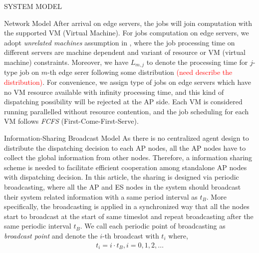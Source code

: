 \documentclass[10pt, conference, letterpaper]{IEEEtran}
\newcommand{\jSpace}{\mathcal{J}}
\begin{document}
\begin{section}{SYSTEM MODEL}
\begin{subsection}{Network Model}
            After arrival on edge servers, the jobs will join computation with the supported VM (Virtual Machine).
            For jobs computation on edge servers, we adopt \emph{unrelated machines} assumption in \cite{tan-online}, where the job processing time on different servers are machine dependent and variant of resource or VM (virtual machine) constraints.
            Moreover, we have $L_{m,j}$ to denote the processing time for $j$-type job on $m$-th edge serer following some distribution \textcolor{red}{(need describe the distribution)}.
            For convenience, we assign type of jobs on edge servers which have no VM resource available with infinity processing time, and this kind of dispatching possibility will be rejected at the AP side.
            Each VM is considered running parallelled without resource contention, and the job scheduling for each VM follows \emph{FCFS} (First-Come-First-Serve).
        \end{subsection}

        \begin{subsection}{Information-Sharing Broadcast Model}
            As there is no centralized agent design to distribute the dispatching decision to each AP nodes, all the AP nodes have to collect the global information from other nodes. Therefore, a information sharing scheme is needed to facilitate efficient cooperation among standalone AP nodes with dispatching decision.
            In this article, the sharing is designed via periodic broadcasting, where all the AP and ES nodes in the system should broadcast their system related information with a same period interval as $t_B$. More specifically, the broadcasting is applied in a synchronized way that all the nodes start to broadcast at the start of same timeslot and repeat broadcasting after the same periodic interval $t_B$. We call each periodic point of broadcasting as \emph{broadcast point} and denote the $i$-th broadcast with $t_i$ where,
            \begin{align}
                t_i = i \cdot t_B, i=0,1,2,\dots
            \end{align}
            

\end{subsection}
\end{section}
\end{document}
